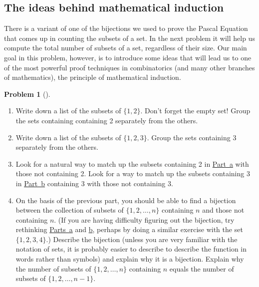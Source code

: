 \documentclass[10pt,]{book}
\theoremstyle{plain}
\theoremstyle{definition}
\newtheorem{activity}[project]{Problem}
\theoremstyle{definition}
\numberwithin{equation}{chapter}
\begin{document}
\subsection[{The ideas behind mathematical induction}]{The ideas behind mathematical induction}\label{subsection-73}
There is a variant of one of the bijections we used to prove the Pascal Equation that comes up in counting the subsets of a set. In the next problem it will help us compute the total number of subsets of a set, regardless of their size. Our main goal in this problem, however, is to introduce some ideas that will lead us to one of the most powerful proof techniques in combinatorics (and many other branches of mathematics), the principle of mathematical induction.%
\begin{activity}[]\marginsymbol[-1em]{} \label{subsetsbysmallestcounterexample}
\leavevmode%
\begin{enumerate}[font=\bfseries,label=(\alph*),ref=\alph*]
\item\label{subsetsbysmallestcounterexample1} \marginsymbol[-2.5em]{} Write down a list of the subsets of \(\{1, 2 \}\). Don't forget the empty set! Group the sets containing containing 2 separately from the others.%
\item\label{subsetsbysmallestcounterexample2} \marginsymbol[-2.5em]{} Write down a list of the subsets of \(\{1, 2, 3 \}\). Group the sets containing 3 separately from the others.%
\item\label{task-256} \marginsymbol[-2.5em]{} Look for a natural way to match up the subsets containing 2 in \hyperref[subsetsbysmallestcounterexample1]{Part~a} with those not containing 2. Look for a way to match up the subsets containing 3 in \hyperref[subsetsbysmallestcounterexample2]{Part~b} containing 3 with those not containing 3.%
\item\label{task-257} \marginsymbol[-2.5em]{} On the basis of the previous part, you should be able to find a bijection between the collection of subsets of \(\{1, 2, \ldots , n \}\) containing \(n\) and those not containing \(n\). (If you are having difficulty figuring out the bijection, try rethinking \hyperref[subsetsbysmallestcounterexample1]{Parts~a} and \hyperref[subsetsbysmallestcounterexample2]{b}, perhaps by doing a similar exercise with the set \(\{1,2,3,4\}\).) Describe the bijection (unless you are very familiar with the notation of sets, it is probably easier to describe to describe the function in words rather than symbols) and explain why it is a bijection. Explain why the number of subsets of \(\{1, 2, \ldots , n \}\) containing \(n\) equals the number of subsets of \(\{1, 2, \ldots, n-1 \}\).%

\end{enumerate}
\end{activity}
\end{document}
